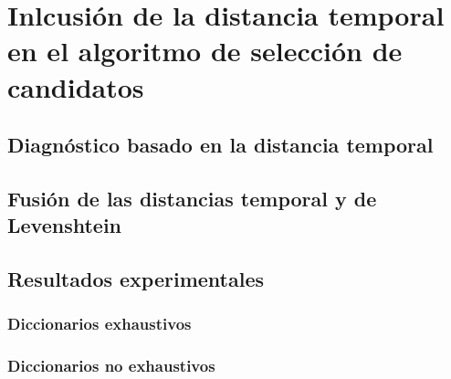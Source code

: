 \chapter{Inlcusión de la distancia temporal en el algoritmo de selección de
candidatos}
\label{ch:Cycle}

\lettrine[lraise=-0.1, lines=2, loversize=0.2]{}{}


\section{Diagnóstico basado en la distancia temporal}
\label{sec:CycleCands}


\section{Fusión de las distancias temporal y de Levenshtein}
\label{sec:FusionLevenCycle}


\section{Resultados experimentales}
\label{sec:CycleResults}


\subsection{Diccionarios exhaustivos}
\label{subsec:CycDicExhaust}


\subsection{Diccionarios no exhaustivos}
\label{subsec:CycDicNoExhaust}


\endinput
